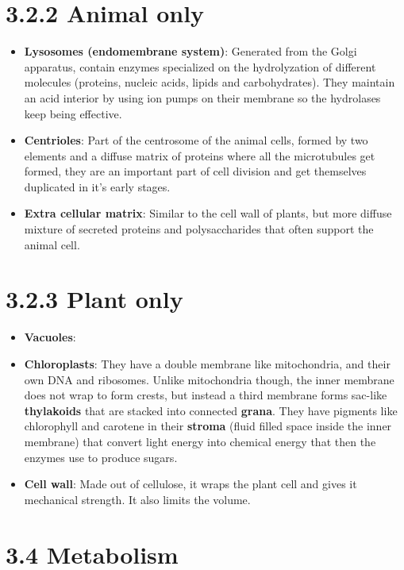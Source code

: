 \documentclass[a4paper,landscape,10pt]{cheatsheet}
\begin{document}
\section*{3.2.2 Animal only}
\begin{itemize}
      \item \textbf{Lysosomes (endomembrane system)}: Generated from the Golgi apparatus, contain enzymes specialized on the hydrolyzation of different
            molecules (proteins, nucleic acids, lipids and carbohydrates). They maintain an acid interior by using ion pumps on
            their membrane so the hydrolases keep being effective.
      \item \textbf{Centrioles}: Part of the centrosome of the animal cells, formed by two elements and a diffuse matrix
            of proteins where all the microtubules get formed, they are an important part of cell division and get
            themselves duplicated in it's early stages.
      \item \textbf{Extra cellular matrix}: Similar to the cell wall of plants, but more diffuse mixture of secreted
            proteins and polysaccharides that often support the animal cell.
\end{itemize}

\section*{3.2.3 Plant only}
\begin{itemize}
      \item \textbf{Vacuoles}:
      \item \textbf{Chloroplasts}: They have a double membrane like mitochondria, and their own DNA and ribosomes.
            Unlike mitochondria though, the inner membrane does not wrap to form crests, but instead a third membrane forms
            sac-like \textbf{thylakoids} that are stacked into connected \textbf{grana}. They have pigments like
            chlorophyll and carotene in their \textbf{stroma} (fluid filled space inside the inner membrane) that
            convert light energy into chemical energy that then the enzymes use to produce sugars.
      \item \textbf{Cell wall}: Made out of cellulose, it wraps the plant cell and gives it mechanical strength. It also
            limits the volume.
\end{itemize}
\vfill\null

\section*{3.4 Metabolism}
\end{document}

